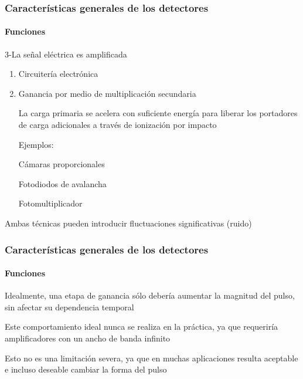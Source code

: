 \documentclass{beamer}
\begin{document}
\begin{frame}
\frametitle{Caracter\'isticas generales de los detectores}
\framesubtitle{{\color{blue}Funciones}}
\begin{block}{3-La señal el\'ectrica es amplificada}
\begin{enumerate}
\item {\color[rgb]{0.5,0,0.13}Circuiter\'ia electr\'onica}
\item {\color[rgb]{0.5,0,0.13}Ganancia por medio de multiplicaci\'on secundaria}

La carga primaria se acelera con suficiente energ\'ia para liberar los portadores
de carga adicionales a trav\'es de ionizaci\'on por impacto

Ejemplos:

\alert{C\'amaras proporcionales}

\alert{Fotodiodos de avalancha}

\alert{Fotomultiplicador}
\end{enumerate}
\end{block}
\begin{alertblock}{}
Ambas t\'ecnicas pueden introducir fluctuaciones significativas (ruido)
\end{alertblock}
\end{frame} 

\begin{frame}
\frametitle{Caracter\'isticas generales de los detectores}
\framesubtitle{{\color{blue}Funciones}}
\begin{block}{Idealmente, una etapa de ganancia s\'olo deber\'ia aumentar la magnitud del
pulso, sin afectar su dependencia temporal}

Este comportamiento ideal nunca se realiza en la pr\'actica, ya que
\alert{requerir\'ia amplificadores con un ancho de banda infinito}

\vspace*{10mm}

{\color[rgb]{0,0.26,0.15}Esto no es una limitaci\'on severa, ya que en muchas
aplicaciones resulta aceptable e incluso deseable cambiar la forma del pulso}
\end{block}
\end{frame} 
\end{document}
